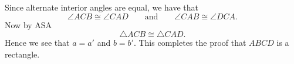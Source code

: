 \documentclass[newpage,hints,handout,noauthor,nooutcomes,12pt]{ximera}
\begin{document}
\begin{problem}
\begin{enumerate}
\begin{freeResponse}
\begin{image}
\end{image}
Since alternate interior angles are equal, we have that
\[
\angle ACB \cong \angle CAD\qquad\text{and}\qquad \angle CAB \cong \angle DCA.
\]
Now by ASA
\[
\triangle ACB \cong \triangle CAD.
\]
Hence we see that $a = a'$ and $b = b'$. This completes the proof that
$ABCD$ is a rectangle.
\end{freeResponse}
\end{enumerate}
\end{problem}








\end{document}
